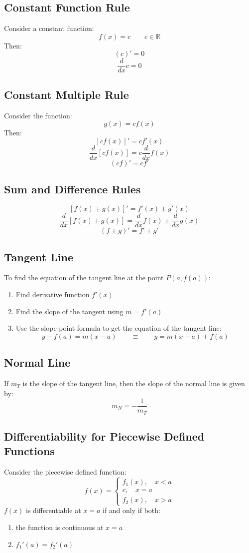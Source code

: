 		\subsection{Constant Function Rule}
			Consider a constant function:
			\[f(x) = c \qquad c \in \mathbb{R}\]
			Then:
			\[(c)' = 0\]
			\[\frac{d}{dx}c=0\]
		\subsection{Constant Multiple Rule}
			Consider the function:
			\[g(x)=cf(x)\]
			Then:
			\[[cf(x)]' = cf'(x)\]
			\[\frac{d}{dx}[cf(x)] = c\frac{d}{dx}f(x)\]
			\[(cf)'=cf'\]
		\subsection{Sum and Difference Rules}
			\[[f(x) \pm g(x)]' = f'(x) \pm g'(x)\]
			\[\frac{d}{dx}[f(x) \pm g(x)] = \frac{d}{dx}f(x) \pm \frac{d}{dx}g(x)\]
			\[(f \pm g)' = f' \pm g'\]
		\subsection{Tangent Line}
			To find the equation of the tangent line at the point $P(a,f(a))$:
			\begin{enumerate}
				\item Find derivative function $f'(x)$
				\item Find the slope of the tangent using $m=f'(a)$
				\item Use the slope-point formula to get the equation of the tangent line:
					\[y-f(a)=m(x-a) \qquad \equiv \qquad y = m(x-a) + f(a)\]
			\end{enumerate}
		\subsection{Normal Line}
			If $m_T$ is the slope of the tangent line, then the slope of the normal line is given by:
			\[m_N = -\frac{1}{m_T}\]
		\subsection{Differentiability for Piecewise Defined Functions}
			Consider the piecewise defined function:
			\begin{equation*}
				f(x)=
				\begin{cases}
					f_1(x), \quad x < a\\
					c, \quad x = a\\
					f_2(x), \quad x > a
				\end{cases}
			\end{equation*}
			$f(x)$ is differentiable at $x=a$ if and only if both:
			\begin{enumerate}
				\item the function is continuous at $x=a$
				\item $f_1'(a) = f_2'(a)$
			\end{enumerate}
